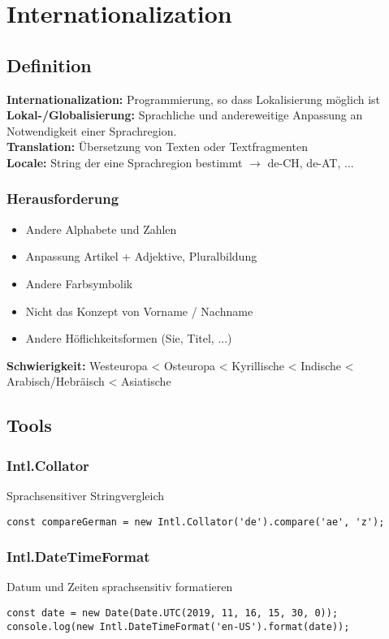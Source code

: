 
\section{Internationalization}

\subsection{Definition}
\textbf{Internationalization:} Programmierung, so dass Lokalisierung möglich ist \\
\textbf{Lokal-/Globalisierung:} Sprachliche und andereweitige Anpassung an Notwendigkeit einer Sprachregion.\\
\textbf{Translation:} Übersetzung von Texten oder Textfragmenten\\
\textbf{Locale:} String der eine Sprachregion bestimmt $\rightarrow$ de-CH, de-AT, ...
\subsubsection{Herausforderung}
\begin{itemize}
    \item  Andere Alphabete und Zahlen
    \item  Anpassung Artikel + Adjektive, Pluralbildung
    \item  Andere Farbsymbolik
    \item  Nicht das Konzept von Vorname / Nachname
    \item  Andere Höflichkeitsformen (Sie, Titel, ...)
\end{itemize}
\textbf{Schwierigkeit:} Westeuropa < Osteuropa < Kyrillische < Indische < Arabisch/Hebräisch < Asiatische


\subsection{Tools}
\subsubsection{Intl.Collator}
Sprachsensitiver Stringvergleich
\begin{lstlisting}
const compareGerman = new Intl.Collator('de').compare('ae', 'z');
\end{lstlisting}

\subsubsection{Intl.DateTimeFormat}
Datum und Zeiten sprachsensitiv formatieren
\begin{lstlisting}
const date = new Date(Date.UTC(2019, 11, 16, 15, 30, 0));
console.log(new Intl.DateTimeFormat('en-US').format(date));
\end{lstlisting}


